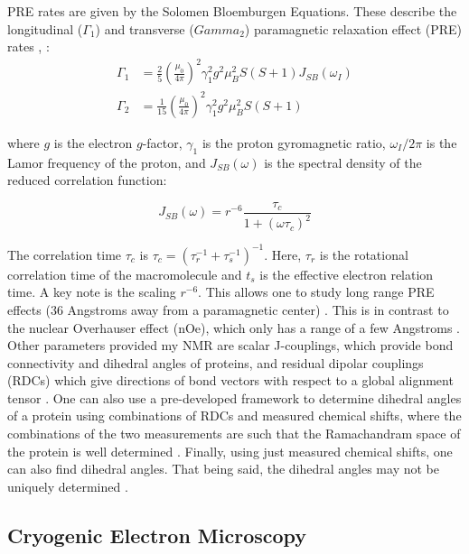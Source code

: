 \documentclass{article}
\begin{document}
PRE rates are given by the Solomen Bloemburgen Equations. 
These describe the longitudinal ($\Gamma_1$) and transverse ($Gamma_2$) paramagnetic relaxation effect (PRE) rates \cite{bloembergenProtonRelaxationTimes1961},\cite{solomonRelaxationProcessesSystem1955}
: 
\begin{align}
\Gamma_1 &= \frac{2}{5} \left( \frac{\mu_0}{4\pi} \right)^2 \gamma_1^2 g^2 \mu_B^2 S(S+1)J_{SB}(\omega_I)\\
\Gamma_2 &= \frac{1}{15} \left( \frac{\mu_0}{4\pi} \right)^2 \gamma_1^2 g^2 \mu_B^2 S(S+1)
\end{align}


where $g$ is the electron $g$-factor, $\gamma_1$ is the proton gyromagnetic ratio, $\omega_I/2\pi$ is the Lamor frequency of the proton, and $J_{SB}(\omega)$ is the spectral density of the reduced correlation function:

\begin{equation}
J_{SB}(\omega) = r^{-6} \frac{\tau_c}{1+ \left( \omega \tau_c \right)^2}
\end{equation}

The correlation time $\tau_c$ is $\tau_c = \left (\tau_r^{-1} + \tau_s^{-1}\right)^{-1}$.
Here, $\tau_r$ is the rotational correlation time of the macromolecule and $t_s$ is the effective electron relation time. 
A key note is the scaling $r^{-6}$.
This allows one to study long range PRE effects (36 Angstroms away from a paramagnetic center) \cite{cloreTheoryPracticeApplications2009}.
This is in contrast to the nuclear Overhauser effect (nOe), which only has a range of a few Angstroms \cite{cloreTheoryPracticeApplications2009}.
Other parameters provided my NMR are scalar J-couplings, which provide bond connectivity and dihedral angles of proteins, and residual dipolar couplings (RDCs) which give directions of bond vectors with respect to a global alignment tensor \cite{marionIntroductionBiologicalNMR2013}. One can also use a pre-developed framework to determine dihedral angles of a protein using combinations of RDCs and measured chemical shifts, where the combinations of the two measurements are such that the Ramachandram space of the protein is well determined \cite{ozenneMappingPotentialEnergy2012}. Finally, using just measured chemical shifts, one can also find dihedral angles. That being said, the dihedral angles may not be uniquely determined \cite{krageljConformationalPropensitiesIntrinsically2013}. 

\subsection{Cryogenic Electron Microscopy} 
\end{document}
